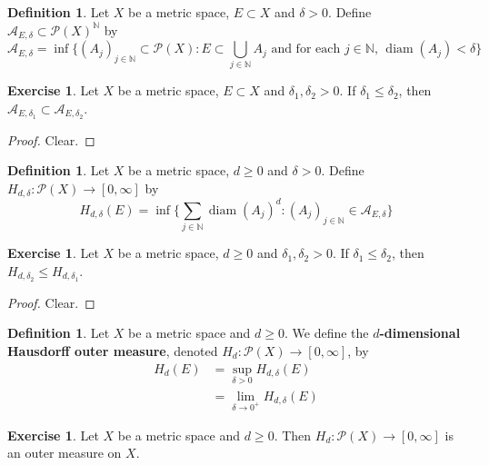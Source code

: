 \documentclass[12pt]{amsart}
\theoremstyle{definition}
\newtheorem{defn}[definition]{Definition}
\newtheorem{ex}[definition]{Exercise}
\newcommand{\del}{\delta}
\newcommand{\N}{\mathbb{N}}
\newcommand{\MA}{\mathcal{A}}
\newcommand{\MP}{\mathcal{P}}
\DeclareMathOperator{\diam}{diam}
\begin{document}
	
	\begin{defn}
	Let $X$ be a metric space, $E \subset X$ and $\del >0$. Define $\MA_{E, \del} \subset \MP(X)^{\N}$ by 
	\begin{equation*}
	 \MA_{E, \del} = \inf \bigg \{(A_j)_{j \in \N} \subset \MP(X): E \subset \bigcup\limits_{j \in \N}A_j \text{ and for each $j \in \N$, } \diam(A_j) < \del \bigg \}
	\end{equation*}
	\end{defn}
	
	\begin{ex}
	Let $X$ be a metric space, $E \subset X$ and $\del_1, \del_2 >0$. If $\del_1 \leq \del_2$, then $\MA_{E, \del_1} \subset \MA_{E, \del_2}$.
	\end{ex}
	
	\begin{proof}
	Clear.
	\end{proof}
	
	\begin{defn}
	Let $X$ be a metric space, $d \geq 0$ and $\del >0$. Define $H_{d, \del}: \MP(X) \rightarrow [0, \infty]$ by 
	\begin{equation*}
	H_{d, \del}(E) = \inf \bigg \{\sum_{j \in \N} \diam(A_j)^d: (A_j)_{j \in \N} \in \MA_{E, \del} \bigg \}
	\end{equation*}
	\end{defn}
	
	\begin{ex}
	Let $X$ be a metric space, $d \geq 0$ and $\del_1, \del_2 >0$. If $\del_1 \leq \del_2$, then $H_{d, \del_2} \leq H_{d, \del_1}$.
	\end{ex}
	
	\begin{proof}
	Clear.
	\end{proof}
	
	\begin{defn}
	Let $X$ be a metric space and $d \geq 0$. We define the \textbf{$d$-dimensional Hausdorff outer measure}, denoted $H_{d}: \MP(X) \rightarrow [0, \infty]$, by 
	\begin{align*}
	H_{d}(E) 
	&= \sup_{\del > 0} H_{d, \del}(E) \\
	&= \lim_{\del \rightarrow 0^+} H_{d, \del}(E)
	\end{align*}
	\end{defn}
	
	\begin{ex}
	Let $X$ be a metric space and $d \geq 0$. Then $H_d: \MP(X) \rightarrow [0, \infty]$ is an outer measure on $X$.
	\end{ex}
	
\end{document}
